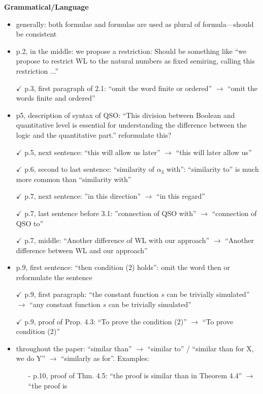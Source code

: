 \vspace{1em}
{\bf Grammatical/Language}
\begin{itemize}
	\setlength\itemsep{0.5em}
	\item generally: both formulae and formulas are used as plural of formula---should be consistent
	\item p.2, in the middle: we propose a restriction: Should be something like ``we propose to restrict
	WL to the natural numbers as fixed semiring, calling this restriction ...''
	\item[$\checkmark$] p.3, first paragraph of 2.1: ``omit the word finite or ordered'' $\to$ ``omit the words finite and
	ordered''
	\item p5, description of syntax of QSO: ``This division between Boolean and quantitative level
	is essential for understanding the difference between the logic and the quantitative part.''
	reformulate this?
	\item[$\checkmark$] p.5, next sentence: ``this will allow us later'' $\to$ ``this will later allow us''
	\item[$\checkmark$] p.6, second to last sentence: ``similarity of $\alpha_3$ with'': ``similarity to'' is much more common
	than ``similarity with''
	\item[$\checkmark$] p.7, next sentence: ''in this direction'' $\to$ ``in this regard''
	\item[$\checkmark$] p.7, last sentence before 3.1: ''connection of QSO with'' $\to$ ``connection of QSO to''
	\item[$\checkmark$] p.7, middle: ``Another difference of WL with our approach'' $\to$ ``Another difference between
	WL and our approach''
	\item p.9, first sentence: ``then condition (2) holds'': omit the word then or reformulate the sentence
	\item[$\checkmark$] p.9, first paragraph: ``the constant function $s$ can be trivially simulated'' $\to$ ``any constant
	function $s$ can be trivially simulated''
	\item[$\checkmark$] p.9, proof of Prop. 4.3: ``To prove the condition (2)'' $\to$ ``To prove condition (2)''
	\item throughout the paper: ``similar than'' $\to$ ``similar to'' / ``similar than for X, we do Y'' $\to$
	``similarly as for''. Examples:
	\begin{itemize}
	\item[-] p.10, proof of Thm. 4.5: ``the proof is similar than in Theorem 4.4'' $\to$ ``the proof is

\end{itemize}
\end{itemize}
